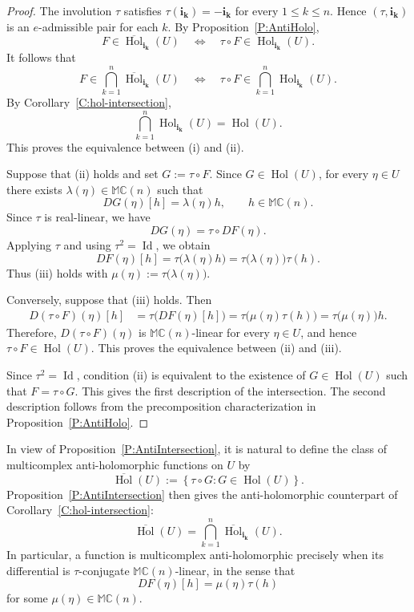 \documentclass[12pt]{amsart}
\theoremstyle{plain}
\theoremstyle{definition}
\numberwithin{equation}{section}
\newcommand{\im}[1]{\mathbf{ i_{#1}}}
\newcommand{\mC}{\mathbb{C}}
\newcommand{\mM}{\mathbb{M}}
\DeclareMathOperator{\hol}{Hol}
\begin{document}
\begin{proof}
The involution $\tau$ satisfies $\tau(\im{k})=-\im{k}$ for every
$1\leq k\leq n$. Hence $(\tau,\im{k})$ is an $e$-admissible pair for each
$k$. By Proposition~\ref{P:AntiHolo},
\[
F\in\overline{\hol}_{\im{k}}(U)
\quad\Longleftrightarrow\quad
\tau\circ F\in\hol_{\im{k}}(U).
\]
It follows that
\[
F\in\bigcap_{k=1}^{n}\overline{\hol}_{\im{k}}(U)
\quad\Longleftrightarrow\quad
\tau\circ F\in\bigcap_{k=1}^{n}\hol_{\im{k}}(U).
\]
By Corollary~\ref{C:hol-intersection},
\[
\bigcap_{k=1}^{n}\hol_{\im{k}}(U)
=
\hol(U).
\]
This proves the equivalence between \textnormal{(i)} and
\textnormal{(ii)}.

Suppose that \textnormal{(ii)} holds and set $G:=\tau\circ F$. Since
$G\in\hol(U)$, for every $\eta\in U$ there exists
$\lambda(\eta)\in\mM \mC(n)$ such that
\[
DG(\eta)[h]=\lambda(\eta)h,
\qquad
h\in\mM \mC(n).
\]
Since $\tau$ is real-linear, we have
\[
DG(\eta)=\tau\circ DF(\eta).
\]
Applying $\tau$ and using $\tau^2=\operatorname{Id}$, we obtain
\[
DF(\eta)[h]
=
\tau\bigl(\lambda(\eta)h\bigr)
=
\tau\bigl(\lambda(\eta)\bigr)\tau(h).
\]
Thus \textnormal{(iii)} holds with
$\mu(\eta):=\tau\bigl(\lambda(\eta)\bigr)$.

Conversely, suppose that \textnormal{(iii)} holds. Then
\[
\begin{aligned}
D(\tau\circ F)(\eta)[h]
&=
\tau\bigl(DF(\eta)[h]\bigr) =
\tau\bigl(\mu(\eta)\tau(h)\bigr) =
\tau\bigl(\mu(\eta)\bigr)h.
\end{aligned}
\]
Therefore, $D(\tau\circ F)(\eta)$ is $\mM \mC(n)$-linear for every
$\eta\in U$, and hence $\tau\circ F\in\hol(U)$. This proves the
equivalence between \textnormal{(ii)} and \textnormal{(iii)}.

Since $\tau^2=\operatorname{Id}$, condition \textnormal{(ii)} is
equivalent to the existence of $G\in\hol(U)$ such that
$F=\tau\circ G$. This gives the first description of the intersection.
The second description follows from the precomposition characterization
in Proposition~\ref{P:AntiHolo}.
\end{proof}

In view of Proposition~\ref{P:AntiIntersection}, it is natural to define the class
of multicomplex anti-holomorphic functions on $U$ by
\[
\overline{\hol}(U)
:=
\left\{
\tau\circ G : G\in\hol(U)
\right\}.
\]
Proposition~\ref{P:AntiIntersection} then gives the anti-holomorphic counterpart
of Corollary~\ref{C:hol-intersection}:
\[
\overline{\hol}(U)
=
\bigcap_{k=1}^{n}\overline{\hol}_{\im{k}}(U).
\]
In particular, a function is multicomplex anti-holomorphic precisely
when its differential is $\tau$-conjugate $\mM \mC(n)$-linear, in the sense that
\[
DF(\eta)[h]=\mu(\eta)\tau(h)
\]
for some $\mu(\eta)\in\mM \mC(n)$.
\end{document}
